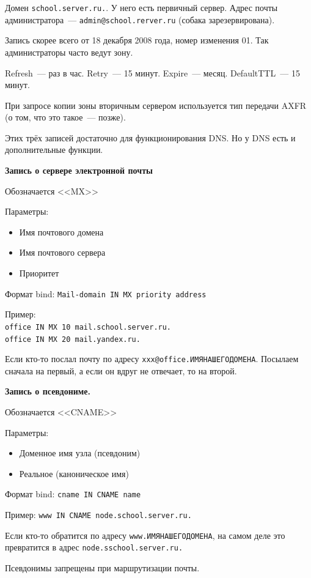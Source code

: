 Домен {\tt school.server.ru.}. У него есть первичный сервер. Адрес почты администратора~--- {\tt admin@school.rerver.ru} (собака зарезервирована).

Запись скорее всего от 18 декабря 2008 года, номер изменения 01. Так администраторы часто ведут зону.

Refresh~--- раз в час. Retry~--- 15 минут. Expire~--- месяц. DefaultTTL~--- 15 минут.

При запросе копии зоны вторичным сервером используется тип передачи AXFR (о том, что это такое~--- позже).

Этих трёх записей достаточно для функционирования DNS. Но у DNS есть и дополнительные функции.

{\bf Запись о сервере электронной почты}

Обозначается <<MX>>

Параметры:
 \begin{itemize}
    \item Имя почтового домена
    \item Имя почтового сервера
    \item Приоритет
\end{itemize}

Формат bind: {\tt Mail-domain IN MX priority address}

Пример: \\
{\tt office IN MX 10 mail.school.server.ru.}\\
{\tt office IN MX 20 mail.yandex.ru.}

Если кто-то послал почту по адресу {\tt xxx@office.ИМЯНАШЕГОДОМЕНА}. Посылаем сначала на первый, а если он вдруг не отвечает, то на второй.

{\bf Запись о псевдониме.}

Обозначается <<CNAME>>

Параметры:
\begin{itemize}
    \item Доменное имя узла (псевдоним)
    \item Реальное (каноническое имя)
\end{itemize}

Формат bind: {\tt сname IN CNAME name}

Пример: {\tt www IN CNAME node.school.server.ru.}

Если кто-то обратится по адресу {\tt www.ИМЯНАШЕГОДОМЕНА}, на самом деле это превратится в адрес {\tt node.sschool.server.ru.}

Псевдонимы запрещены при маршрутизации почты.


